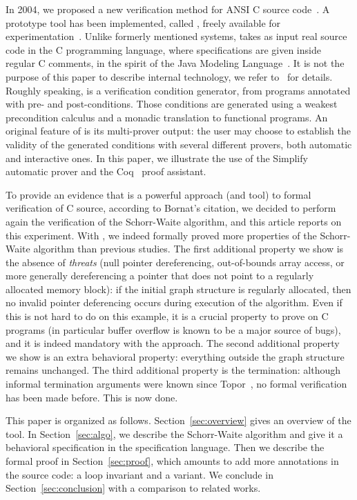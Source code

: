 In 2004, we proposed a new verification method for ANSI C source
code~\cite{filliatre04icfem}.  A prototype tool has been implemented,
called \caduceus{}, freely available for
experimentation~\cite{Caduceus}. Unlike formerly mentioned systems,
\caduceus{} takes as input real source code in the C programming
language, where specifications are given inside regular C comments, in
the spirit of the Java Modeling Language~\cite{leavens00jml}. It is
not the purpose of this paper to describe \caduceus{} internal
technology, we refer to~\cite{filliatre04icfem} for details. Roughly
speaking, \caduceus{} is a verification condition generator, from
programs annotated with pre- and post-conditions. Those conditions are
generated using a weakest precondition calculus and a monadic
translation to functional programs. An original feature of \caduceus{}
is its multi-prover output: the user may choose to establish the
validity of the generated conditions with several different provers,
both automatic and interactive ones. In this paper, we illustrate the
use of the Simplify~\cite{simplify} automatic prover and the
Coq~\cite{CoqProofAssistant} proof assistant.

To provide an evidence that \caduceus{} is a powerful approach (and
tool) to formal verification of C source, according to Bornat's
citation, we decided to perform again the verification of the
Schorr-Waite algorithm, and this article reports on this experiment.
With \caduceus{}, we indeed formally proved more properties of the
Schorr-Waite algorithm than previous studies.  The first additional
property we show is the absence of \emph{threats} (null pointer
dereferencing, out-of-bounds array access, or more generally dereferencing
a pointer that does not point to a regularly allocated memory block):
if the initial graph structure is regularly allocated, then no invalid pointer deferencing occurs during execution
of the algorithm. Even if this is not hard to do on this example, it
is a crucial property to prove on C programs (in particular buffer
overflow is known to be a major source of bugs), and it is indeed
mandatory with the \caduceus{} approach. The second additional
property we show is an extra behavioral property: everything outside
the graph structure remains unchanged. The third additional property is
the termination: although informal termination arguments were known
since Topor~\cite{topor79acta}, %
no formal verification has been made before. This is now done.

This paper is organized as follows.  Section~\ref{sec:overview} gives
an overview of the \caduceus{} tool.  In Section~\ref{sec:algo}, we
describe the Schorr-Waite algorithm and give it a behavioral
specification in the \caduceus{} specification language.  Then we
describe the formal proof in Section~\ref{sec:proof}, which
amounts to add more annotations in the source code: a loop invariant
and a variant. We conclude in Section~\ref{sec:conclusion} with a
comparison to related works.





